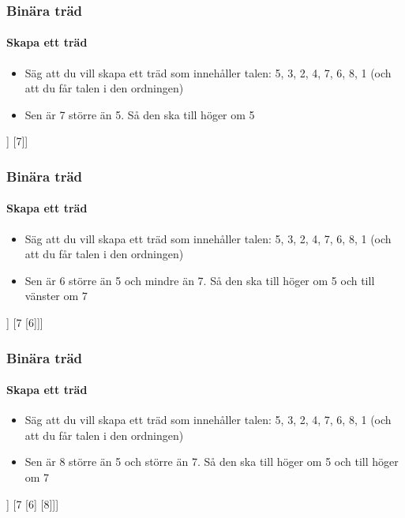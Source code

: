 \documentclass[aspectratio=169]{beamer}
\begin{document}
\begin{frame}
	\frametitle{Binära träd}
	\framesubtitle{Skapa ett träd}
	
	\begin{itemize}
		\item Säg att du vill skapa ett träd som innehåller talen: 5, 3, 2, 4, 7, 6, 8, 1 (och att du får talen i den ordningen)
		\item Sen är 7 större än 5. Så den ska till höger om 5
	\end{itemize}
	
	\centering
	\begin{forest}
		[5 [3 [2] [4]] [7]]
	\end{forest}

\end{frame}

\begin{frame}
	\frametitle{Binära träd}
	\framesubtitle{Skapa ett träd}
	
	\begin{itemize}
		\item Säg att du vill skapa ett träd som innehåller talen: 5, 3, 2, 4, 7, 6, 8, 1 (och att du får talen i den ordningen)
		\item Sen är 6 större än 5 och mindre än 7. Så den ska till höger om 5 och till vänster om 7
	\end{itemize}
	
	\centering
	\begin{forest}
		[5 [3 [2] [4]] [7 [6]]]
	\end{forest}

\end{frame}

\begin{frame}
	\frametitle{Binära träd}
	\framesubtitle{Skapa ett träd}
	
	\begin{itemize}
		\item Säg att du vill skapa ett träd som innehåller talen: 5, 3, 2, 4, 7, 6, 8, 1 (och att du får talen i den ordningen)
		\item Sen är 8 större än 5 och större än 7. Så den ska till höger om 5 och till höger om 7
	\end{itemize}
	
	\centering
	\begin{forest}
		[5 [3 [2] [4]] [7 [6] [8]]]
	\end{forest}

\end{frame}
\end{document}
